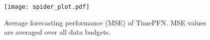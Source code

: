 \begin{figure}[t!] 
   \centering    \texttt{[image: spider\_plot.pdf]}
   \caption{Average forecasting performance (MSE) of TimePFN. MSE values are averaged over all data budgets. }
\end{figure}